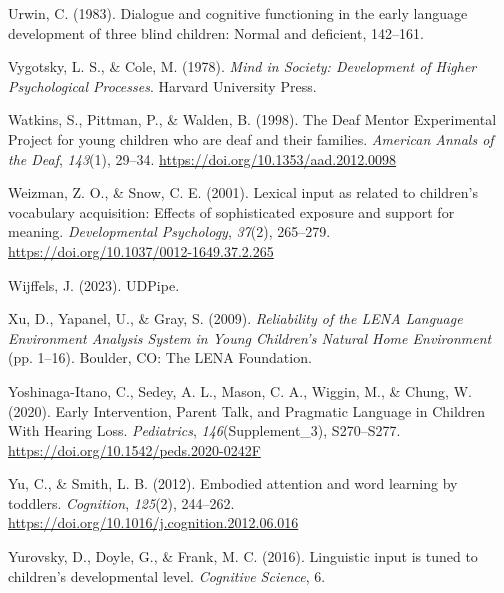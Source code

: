 \documentclass[
  man,floatsintext]{apa6}
\newlength{\cslhangindent}
\newlength{\cslentryspacingunit} %
\newenvironment{CSLReferences}[2] %
 {%
  \setlength{\parindent}{0pt}
  \ifodd #1
  \let\oldpar\par
  \def\par{\hangindent=\cslhangindent\oldpar}
  \fi
  \setlength{\parskip}{#2\cslentryspacingunit}
 }%
 {}
\begin{document}
\begin{CSLReferences}{1}{0}
\leavevmode{}%
Urwin, C. (1983). Dialogue and cognitive functioning in the early language development of three blind children: {Normal} and deficient, 142--161.

\leavevmode{}%
Vygotsky, L. S., \& Cole, M. (1978). \emph{Mind in {Society}: {Development} of {Higher Psychological Processes}}. {Harvard University Press}.

\leavevmode{}%
Watkins, S., Pittman, P., \& Walden, B. (1998). The {Deaf Mentor Experimental Project} for young children who are deaf and their families. \emph{American Annals of the Deaf}, \emph{143}(1), 29--34. \url{https://doi.org/10.1353/aad.2012.0098}

\leavevmode{}%
Weizman, Z. O., \& Snow, C. E. (2001). Lexical input as related to children's vocabulary acquisition: Effects of sophisticated exposure and support for meaning. \emph{Developmental Psychology}, \emph{37}(2), 265--279. \url{https://doi.org/10.1037/0012-1649.37.2.265}

\leavevmode{}%
Wijffels, J. (2023). {UDPipe}.

\leavevmode{}%
Xu, D., Yapanel, U., \& Gray, S. (2009). \emph{Reliability of the {LENA Language Environment Analysis System} in {Young Children}'s {Natural Home Environment}} (pp. 1--16). {Boulder, CO}: {The LENA Foundation}.

\leavevmode{}%
Yoshinaga-Itano, C., Sedey, A. L., Mason, C. A., Wiggin, M., \& Chung, W. (2020). Early {Intervention}, {Parent Talk}, and {Pragmatic Language} in {Children With Hearing Loss}. \emph{Pediatrics}, \emph{146}(Supplement\_3), S270--S277. \url{https://doi.org/10.1542/peds.2020-0242F}

\leavevmode{}%
Yu, C., \& Smith, L. B. (2012). Embodied attention and word learning by toddlers. \emph{Cognition}, \emph{125}(2), 244--262. \url{https://doi.org/10.1016/j.cognition.2012.06.016}

\leavevmode{}%
Yurovsky, D., Doyle, G., \& Frank, M. C. (2016). Linguistic input is tuned to children's developmental level. \emph{Cognitive Science}, 6.

\end{CSLReferences}
\end{document}

